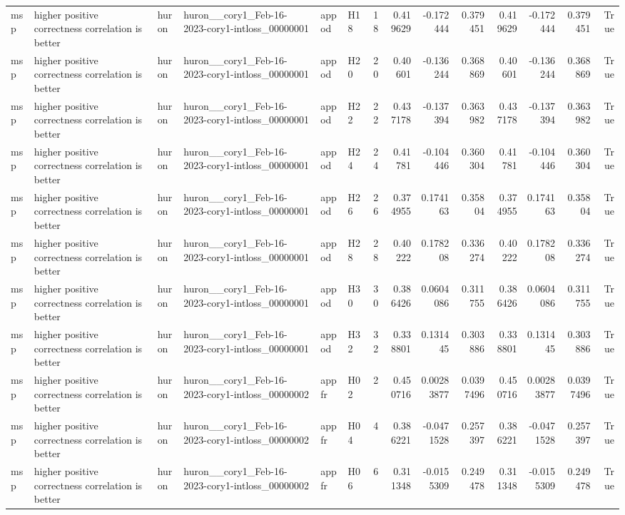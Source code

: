 \begin{longtable}{llllllrrrrrrrr}
msp & higher positive correctness correlation is better & huron & huron\_\_cory1\_Feb-16-2023-cory1-intloss\_00000001 & appod & H18 & 18 & 0.419629 & -0.172444 & 0.379451 & 0.419629 & -0.172444 & 0.379451 & True \\
msp & higher positive correctness correlation is better & huron & huron\_\_cory1\_Feb-16-2023-cory1-intloss\_00000001 & appod & H20 & 20 & 0.40601 & -0.136244 & 0.368869 & 0.40601 & -0.136244 & 0.368869 & True \\
msp & higher positive correctness correlation is better & huron & huron\_\_cory1\_Feb-16-2023-cory1-intloss\_00000001 & appod & H22 & 22 & 0.437178 & -0.137394 & 0.363982 & 0.437178 & -0.137394 & 0.363982 & True \\
msp & higher positive correctness correlation is better & huron & huron\_\_cory1\_Feb-16-2023-cory1-intloss\_00000001 & appod & H24 & 24 & 0.41781 & -0.104446 & 0.360304 & 0.41781 & -0.104446 & 0.360304 & True \\
msp & higher positive correctness correlation is better & huron & huron\_\_cory1\_Feb-16-2023-cory1-intloss\_00000001 & appod & H26 & 26 & 0.374955 & 0.174163 & 0.35804 & 0.374955 & 0.174163 & 0.35804 & True \\
msp & higher positive correctness correlation is better & huron & huron\_\_cory1\_Feb-16-2023-cory1-intloss\_00000001 & appod & H28 & 28 & 0.40222 & 0.178208 & 0.336274 & 0.40222 & 0.178208 & 0.336274 & True \\
msp & higher positive correctness correlation is better & huron & huron\_\_cory1\_Feb-16-2023-cory1-intloss\_00000001 & appod & H30 & 30 & 0.386426 & 0.0604086 & 0.311755 & 0.386426 & 0.0604086 & 0.311755 & True \\
msp & higher positive correctness correlation is better & huron & huron\_\_cory1\_Feb-16-2023-cory1-intloss\_00000001 & appod & H32 & 32 & 0.338801 & 0.131445 & 0.303886 & 0.338801 & 0.131445 & 0.303886 & True \\
msp & higher positive correctness correlation is better & huron & huron\_\_cory1\_Feb-16-2023-cory1-intloss\_00000002 & appfr & H02 & 2 & 0.450716 & 0.00283877 & 0.0397496 & 0.450716 & 0.00283877 & 0.0397496 & True \\
msp & higher positive correctness correlation is better & huron & huron\_\_cory1\_Feb-16-2023-cory1-intloss\_00000002 & appfr & H04 & 4 & 0.386221 & -0.0471528 & 0.257397 & 0.386221 & -0.0471528 & 0.257397 & True \\
msp & higher positive correctness correlation is better & huron & huron\_\_cory1\_Feb-16-2023-cory1-intloss\_00000002 & appfr & H06 & 6 & 0.311348 & -0.0155309 & 0.249478 & 0.311348 & -0.0155309 & 0.249478 & True \\

\end{longtable}
